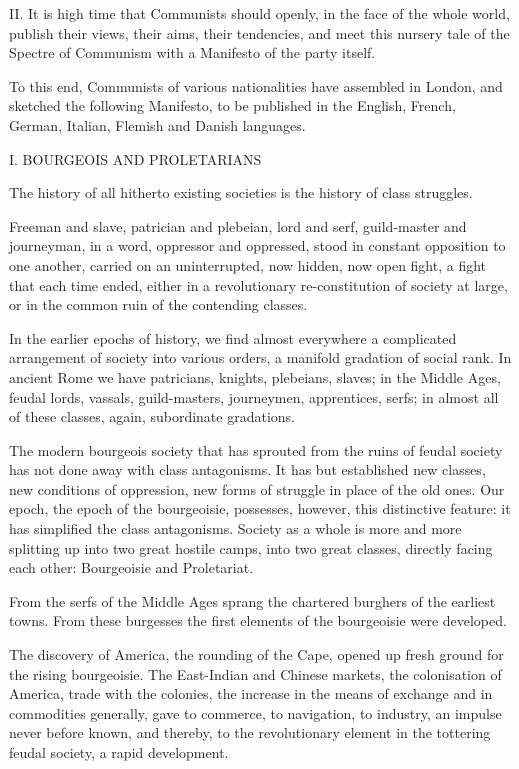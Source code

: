 II. It is high time that Communists should openly, in the face of the
whole world, publish their views, their aims, their tendencies, and
meet this nursery tale of the Spectre of Communism with a Manifesto of
the party itself.

To this end, Communists of various nationalities have assembled in
London, and sketched the following Manifesto, to be published in the
English, French, German, Italian, Flemish and Danish languages.




I.
BOURGEOIS AND PROLETARIANS


The history of all hitherto existing societies is the history of class
struggles.

Freeman and slave, patrician and plebeian, lord and serf, guild-master
and journeyman, in a word, oppressor and oppressed, stood in constant
opposition to one another, carried on an uninterrupted, now hidden, now
open fight, a fight that each time ended, either in a revolutionary
re-constitution of society at large, or in the common ruin of the
contending classes.

In the earlier epochs of history, we find almost everywhere a
complicated arrangement of society into various orders, a manifold
gradation of social rank. In ancient Rome we have patricians, knights,
plebeians, slaves; in the Middle Ages, feudal lords, vassals,
guild-masters, journeymen, apprentices, serfs; in almost all of these
classes, again, subordinate gradations.

The modern bourgeois society that has sprouted from the ruins of feudal
society has not done away with class antagonisms. It has but
established new classes, new conditions of oppression, new forms of
struggle in place of the old ones. Our epoch, the epoch of the
bourgeoisie, possesses, however, this distinctive feature: it has
simplified the class antagonisms. Society as a whole is more and more
splitting up into two great hostile camps, into two great classes,
directly facing each other: Bourgeoisie and Proletariat.

From the serfs of the Middle Ages sprang the chartered burghers of the
earliest towns. From these burgesses the first elements of the
bourgeoisie were developed.

The discovery of America, the rounding of the Cape, opened up fresh
ground for the rising bourgeoisie. The East-Indian and Chinese markets,
the colonisation of America, trade with the colonies, the increase in
the means of exchange and in commodities generally, gave to commerce,
to navigation, to industry, an impulse never before known, and thereby,
to the revolutionary element in the tottering feudal society, a rapid
development.


